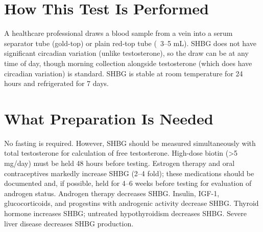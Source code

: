 \section*{How This Test Is Performed}
A healthcare professional draws a blood sample from a vein into a serum separator tube (gold-top) or plain red-top tube (~3--5 mL). SHBG does not have significant circadian variation (unlike testosterone), so the draw can be at any time of day, though morning collection alongside testosterone (which does have circadian variation) is standard. SHBG is stable at room temperature for 24 hours and refrigerated for 7 days.

\section*{What Preparation Is Needed}
No fasting is required. However, SHBG should be measured simultaneously with total testosterone for calculation of free testosterone. High-dose biotin (>5 mg/day) must be held 48 hours before testing. Estrogen therapy and oral contraceptives markedly increase SHBG (2--4 fold); these medications should be documented and, if possible, held for 4--6 weeks before testing for evaluation of androgen status. Androgen therapy decreases SHBG. Insulin, IGF-1, glucocorticoids, and progestins with androgenic activity decrease SHBG. Thyroid hormone increases SHBG; untreated hypothyroidism decreases SHBG. Severe liver disease decreases SHBG production.

